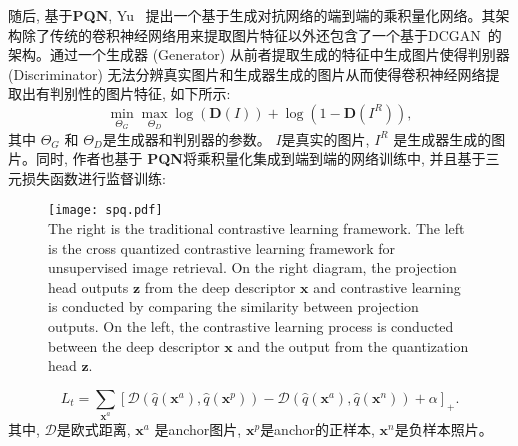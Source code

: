 随后, 基于\textbf{PQN}, Yu~\cite{yu2018generative} 提出一个基于生成对抗网络的端到端的乘积量化网络。其架构除了传统的卷积神经网络用来提取图片特征以外还包含了一个基于DCGAN~\cite{radford2015unsupervised}的架构。通过一个生成器 (Generator) 从前者提取生成的特征中生成图片使得判别器 (Discriminator) 无法分辨真实图片和生成器生成的图片从而使得卷积神经网络提取出有判别性的图片特征, 如下所示:
\begin{equation}
    \min _{\Theta_G} \max _{\Theta_D} \log (\mathbf{D}(I))+\log \left(1-\mathbf{D}\left(I^R\right)\right), 
\end{equation}
其中 $\Theta_G$ 和 $\Theta_D$是生成器和判别器的参数。 $I$是真实的图片, $I^R$ 是生成器生成的图片。同时, 作者也基于 \textbf{PQN}将乘积量化集成到端到端的网络训练中, 并且基于三元损失函数进行监督训练:
\begin{figure}[!htp]
    \centering
    \texttt{[image: spq.pdf]} \\
      {The right is the traditional contrastive learning framework. The left is the cross quantized contrastive learning framework for unsupervised image retrieval. On the right diagram, the projection head outputs $\mathbf{z}$ from the deep descriptor $\mathbf{x}$ and contrastive learning is conducted by comparing the similarity between projection outputs. On the left, the contrastive learning process is conducted between the deep descriptor $\mathbf{x}$ and the output from the quantization head $\mathbf{z}$.}
   \label{fig:spq}
\end{figure}


\begin{equation}
    L_t=\sum_{\mathbf{x}^a}\left[\mathcal{D}\left(\hat{q}\left(\mathbf{x}^a\right), \hat{q}\left(\mathbf{x}^p\right)\right)-\mathcal{D}\left(\hat{q}\left(\mathbf{x}^a\right), \hat{q}\left(\mathbf{x}^n\right)\right)+\alpha\right]_{+}.
\end{equation}
其中, $\mathcal{D}$是欧式距离, $\mathbf{x}^a$ 是anchor图片, $\mathbf{x}^p$是anchor的正样本,  $\mathbf{x}^n$是负样本照片。 \par

